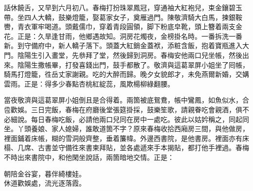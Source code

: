話休饒舌，又早到六月初八。春梅打扮珠翠鳳冠，穿通袖大紅袍兒，束金鑲碧玉帶。坐四人大轎，鼓樂燈籠，娶葛家女子，奠雁過門。陳敬濟騎大白馬，揀銀鞍轡，青衣軍牢喝道。頭戴儒巾，穿着青段圓領，脚下粉底皁靴，頭上簪着兩支金花。正是：久旱逢甘雨，他鄉遇故知。洞房花燭夜，金榜掛名時。一番拆洗一番新。到守備府中，新人轎子落下。頭蓋大紅銷金蓋袱，添粧含飯，抱着寶瓶進入大門。陰陽生引入畫堂，先叅拜了堂，然後歸到洞房。{}春梅安他兩口兒坐帳，然後出來。陰陽生撒帳畢，打發喜錢出門，鼓手都散了。敬濟與這葛翠屏小姐坐了囘帳，騎馬打燈籠，徃岳丈家謝親。吃的大醉而歸。晚夕女貌郎才，未免燕爾新婚，交媾雲雨。正是：得多少春點杏桃紅綻蕊，風欺楊柳綠翻腰。

當夜敬濟與這葛翠屏小姐倒且是合得着。兩箇被底鴛鴦，帳中鸞鳳，如魚似水，合卺歡娛。三日完飯，春梅在府廳後堂張筵掛採，鼓樂笙歌，請親眷吃會親酒，俱不必細說。每日春梅吃飯，必請他兩口兒同在房中一處吃。彼此以姑妗稱之，同起同坐。丫頭養娘、家人媳婦，誰敢道箇不字？原來春梅收拾西廂房三間，與他做房，裡面鋪着床帳，糊的雪洞般齊整，垂着簾幃。外邊西書院，是他書房。裡面亦有床榻、几席、古書並守備徃來書柬拜貼，並各處遞來手本揭貼，都打他手裡過。春梅不時出來書院中，和他閑坐說話，兩箇暗地交情。正是：

\begin{myquote}
朝陪金谷宴，暮伴綺樓娃。\\休道歡娛處，流光逐落霞。
\end{myquote}

